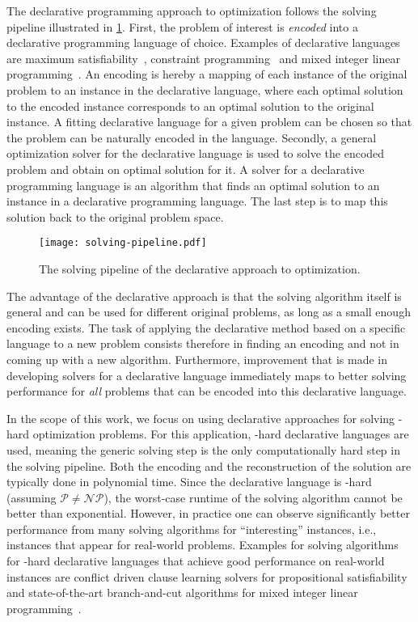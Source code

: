 The declarative programming approach to optimization follows the solving pipeline illustrated in \cref{fig:solving-pipeline}.
First, the problem of interest is \emph{encoded} into a declarative programming language of choice.
Examples of declarative languages are maximum satisfiability~\autocite{handbook2-maxsat}, constraint programming~\autocite{} and mixed integer linear programming~\autocites{ChenEtAl2010-intro,KorteVygen2018-5}.
An encoding is hereby a mapping of each instance of the original problem to an instance in the declarative language, where each optimal solution to the encoded instance corresponds to an optimal solution to the original instance.
A fitting declarative language for a given problem can be chosen so that the problem can be naturally encoded in the language.
Secondly, a general optimization solver for the declarative language is used to solve the encoded problem and obtain on optimal solution for it.
A solver for a declarative programming language is an algorithm that finds an optimal solution to an instance in a declarative programming language.
The last step is to map this solution back to the original problem space.

\begin{figure}
  \centering
  \texttt{[image: solving-pipeline.pdf]}
  \caption{The solving pipeline of the declarative approach to optimization.}\label{fig:solving-pipeline}
\end{figure}

The advantage of the declarative approach is that the solving algorithm itself is general and can be used for different original problems, as long as a small enough encoding exists.
The task of applying the declarative method based on a specific language to a new problem consists therefore in finding an encoding and not in coming up with a new algorithm.
Furthermore, improvement that is made in developing solvers for a declarative language immediately maps to better solving performance for \emph{all} problems that can be encoded into this declarative language.

In the scope of this work, we focus on using declarative approaches for solving \NP-hard optimization problems.
For this application, \NP-hard declarative languages are used, meaning the generic solving step is the only computationally hard step in the solving pipeline.
Both the encoding and the reconstruction of the solution are typically done in polynomial time.
Since the declarative language is \NP-hard (assuming $\mathcal{P}\neq\mathcal{NP}$), the worst-case runtime of the solving algorithm cannot be better than exponential.
However, in practice one can observe significantly better performance from many solving algorithms for ``interesting'' instances, i.e., instances that appear for real-world problems.
Examples for solving algorithms for \NP-hard declarative languages that achieve good performance on real-world instances are conflict driven clause learning solvers for propositional satisfiability~\autocite{handbook2-cdcl} and state-of-the-art branch-and-cut algorithms for mixed integer linear programming~\autocite{ChenEtAl2010-branch-and-cut}.

